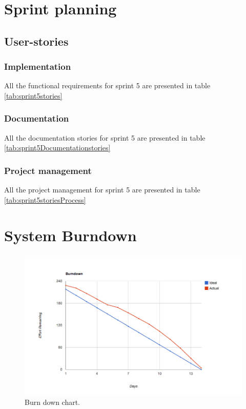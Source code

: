 \section{Sprint planning}
\subsection{User-stories}
\subsubsection*{Implementation}
All the functional requirements for sprint 5 are presented in table \ref{tab:sprint5stories}

\subsubsection*{Documentation}
All the documentation stories for sprint 5 are presented in table \ref{tab:sprint5Documentationstories}

\subsubsection*{Project management}
All the project management for sprint 5 are presented in table \ref{tab:sprint5storiesProcess}

\section{System Burndown}

\begin{figure}[H]
	\centering
		\includegraphics[width=18cm]{sprint5/BurndownSprint5.png}
	\caption{Burn down chart.}
	\label{fig:Burn5 }
\end{figure}

